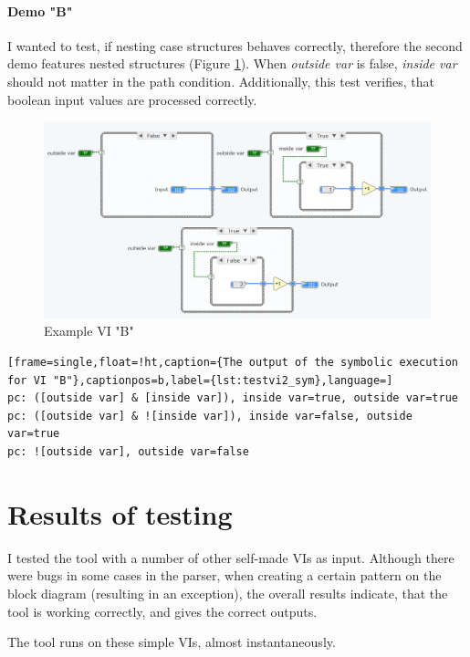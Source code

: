 \paragraph{Demo "B"}
I wanted to test, if nesting case structures behaves correctly, therefore the second demo features nested structures (Figure \ref{fig:testvi2}). When \textit{outside var} is false, \textit{inside var} should not matter in the path condition. Additionally, this test verifies, that boolean input values are processed correctly.

\begin{figure}
\centering
\includegraphics[width=150mm,keepaspectratio]{figures/testvi2.png}
\caption{Example VI "B"} 
\label{fig:testvi2}
\end{figure}


\begin{lstlisting}[frame=single,float=!ht,caption={The output of the symbolic execution for VI "B"},captionpos=b,label={lst:testvi2_sym},language=]
pc: ([outside var] & [inside var]), inside var=true, outside var=true
pc: ([outside var] & ![inside var]), inside var=false, outside var=true
pc: ![outside var], outside var=false
\end{lstlisting}
\section{Results of testing}

I tested the tool with a number of other self-made VIs as input. Although there were bugs in some cases in the parser, when creating a certain pattern on the block diagram (resulting in an exception), the overall results indicate, that the tool is working correctly, and gives the correct outputs.

The tool runs on these simple VIs, almost instantaneously.


